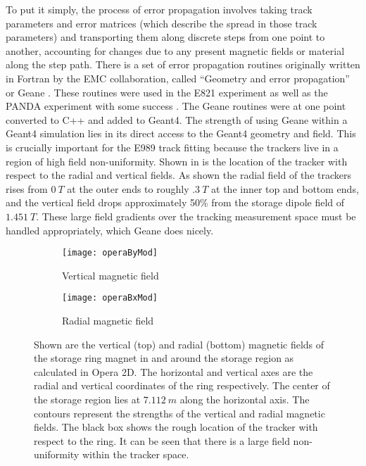To put it simply, the process of error propagation involves taking track parameters and error matrices (which describe the spread in those track parameters) and transporting them along discrete steps from one point to another, accounting for changes due to any present magnetic fields or material along the step path. There is a set of error propagation routines originally written in Fortran by the EMC collaboration, called ``Geometry and error propagation'' or Geane \cite{geanemanual}. These routines were used in the E821 experiment as well as the PANDA experiment with some success \cite{Lavezzi}. The Geane routines were at one point converted to C++ and added to Geant4. The strength of using Geane within a Geant4 simulation lies in its direct access to the Geant4 geometry and field. This is crucially important for the E989 track fitting because the trackers live in a region of high field non-uniformity. Shown in  is the location of the tracker with respect to the radial and vertical fields. As shown the radial field of the trackers rises from $\SI{0}{T}$ at the outer ends to roughly $\SI{.3}{T}$ at the inner top and bottom ends, and the vertical field drops approximately 50\% from the storage dipole field of $\SI{1.451}{T}$. These large field gradients over the tracking measurement space must be handled appropriately, which Geane does nicely.




\begin{figure}[]
\centering
    \begin{subfigure}[]{0.75\textwidth}
        \centering
        \texttt{[image: operaByMod]}
        \caption{Vertical magnetic field}
    \label{fig:operaBy}
    \end{subfigure}%
    \vspace{5mm}
    \begin{subfigure}[]{0.75\textwidth}
        \centering
        \texttt{[image: operaBxMod]}
        \caption{Radial magnetic field}
    \label{fig:operaBx}
    \end{subfigure}
\caption[Vertical and radial magnetic fields calculated in Opera2D]{Shown are the vertical (top) and radial (bottom) magnetic fields of the storage ring magnet in and around the storage region as calculated in Opera 2D. The horizontal and vertical axes are the radial and vertical coordinates of the ring respectively. The center of the storage region lies at $\SI{7.112}{m}$ along the horizontal axis. The contours represent the strengths of the vertical and radial magnetic fields. The black box shows the rough location of the tracker with respect to the ring. It can be seen that there is a large field non-uniformity within the tracker space.}
\label{fig:Opera2DFields}
\end{figure}




